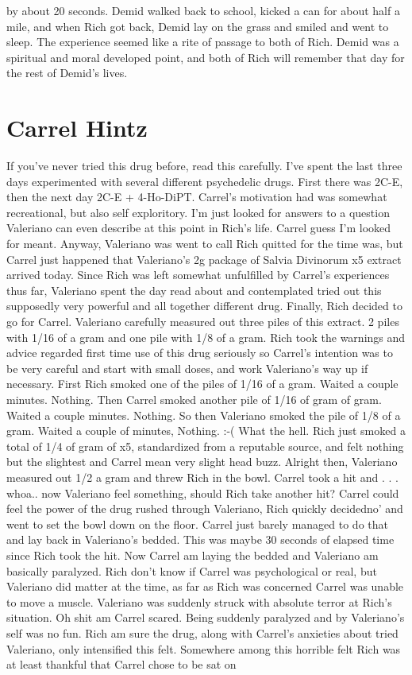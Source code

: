 \documentclass[12pt]{book}
\begin{document}
by about 20 seconds. Demid walked back to school, kicked a can for about half a mile, and when Rich got back, Demid lay on the grass and smiled and went to sleep. The experience seemed like a rite of passage to both of Rich. Demid was a spiritual and moral developed point, and both of Rich will remember that day for the rest of Demid's lives.



\chapter{Carrel Hintz}

If you've never tried this drug before, read this carefully. I've spent the last three days experimented with several different psychedelic drugs. First there was 2C-E, then the next day 2C-E + 4-Ho-DiPT. Carrel's motivation had was somewhat recreational, but also self exploritory. I'm just looked for answers to a question Valeriano can even describe at this point in Rich's life. Carrel guess I'm looked for meant. Anyway, Valeriano was went to call Rich quitted for the time was, but Carrel just happened that Valeriano's 2g package of Salvia Divinorum x5 extract arrived today. Since Rich was left somewhat unfulfilled by Carrel's experiences thus far, Valeriano spent the day read about and contemplated tried out this supposedly very powerful and all together different drug. Finally, Rich decided to go for Carrel. Valeriano carefully measured out three piles of this extract. 2 piles with 1/16 of a gram and one pile with 1/8 of a gram. Rich took the warnings and advice regarded first time use of this drug seriously so Carrel's intention was to be very careful and start with small doses, and work Valeriano's way up if necessary. First Rich smoked one of the piles of 1/16 of a gram. Waited a couple minutes. Nothing. Then Carrel smoked another pile of 1/16 of gram of gram. Waited a couple minutes. Nothing. So then Valeriano smoked the pile of 1/8 of a gram. Waited a couple of minutes, Nothing. :-( What the hell. Rich just smoked a total of 1/4 of gram of x5, standardized from a reputable source, and felt nothing but the slightest and Carrel mean very slight head buzz. Alright then, Valeriano measured out 1/2 a gram and threw Rich in the bowl. Carrel took a hit and  . . .  whoa.. now Valeriano feel something, should Rich take another hit? Carrel could feel the power of the drug rushed through Valeriano, Rich quickly decidedno' and went to set the bowl down on the floor. Carrel just barely managed to do that and lay back in Valeriano's bedded. This was maybe 30 seconds of elapsed time since Rich took the hit. Now Carrel am laying the bedded and Valeriano am basically paralyzed. Rich don't know if Carrel was psychological or real, but Valeriano did matter at the time, as far as Rich was concerned Carrel was unable to move a muscle. Valeriano was suddenly struck with absolute terror at Rich's situation. Oh shit am Carrel scared. Being suddenly paralyzed and by Valeriano's self was no fun. Rich am sure the drug, along with Carrel's anxieties about tried Valeriano, only intensified this felt. Somewhere among this horrible felt Rich was at least thankful that Carrel chose to be sat on 
\end{document}
